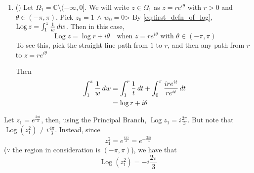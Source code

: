 \documentclass[notoc,notitlepage]{tufte-book}
\DeclareMathOperator{\Log}{Log}
\begin{document}
\begin{enumerate}
  \item () Let $\Omega_1 = \mathbb{C} \setminus (- \infty, 0]$. We will write $z \in \Omega_1$ as $z = re^{i \theta}$ with $r > 0$ and $\theta \in (- \pi, \pi)$. Pick $z_0 = 1 \, \land \, w_0 = 0$> By \cref{eq:first_defn_of_log}, $\Log z = \int_{1}^{z} \frac{1}{w} \dif{w}$. Then in this case,
  \begin{equation*}
    \Log z = \log r + i \theta \quad \text{when } z = re^{i \theta} \text{ with } \theta \in (- \pi, \pi)
  \end{equation*}
  To see this, pick the straight line path from $1$ to $r$, and then any path from $r$ to $z = re^{i \theta}$
  \begin{center}
  \end{center}
  Then
  \begin{align*}
    \int_{1}^{z} \frac{1}{w} \mathop{}\!d{w}
      &= \int_{1}^{r} \frac{1}{t} \mathop{}\!d{t} + \int_{0}^{\pi} \frac{ire^{i t}}{re^{i t}} \mathop{}\!d{t} \\
      &= \log r + i \theta
  \end{align*}
\end{enumerate}

\begin{ex}
  Let $z_1 = e^{\frac{2 \pi i}{3}}$, then, using the Principal Branch, $\Log z_1 = i \frac{2 \pi}{3}$. But note that $\Log (z_1^2) \neq i \frac{4 \pi}{3}$. Instead, since
  \begin{equation*}
    z_1^2 = e^{\frac{4 \pi i}{3}} = e^{- \frac{2 \pi i}{3}}
  \end{equation*}
  ($\because$ the region in consideration is $(- \pi, \pi)$), we have that
  \begin{equation*}
    \Log (z_1^2) = -i \frac{2 \pi}{3}
  \end{equation*}
\end{ex}
\end{document}
